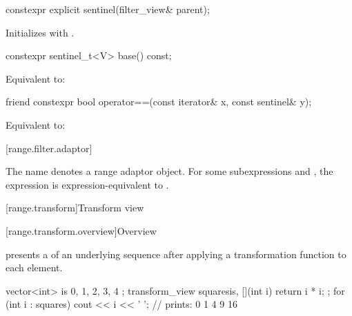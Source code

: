 %
\begin{itemdecl}
constexpr explicit sentinel(filter_view& parent);
\end{itemdecl}

\begin{itemdescr}
\pnum
\effects Initializes  with .
\end{itemdescr}

%
\begin{itemdecl}
constexpr sentinel_t<V> base() const;
\end{itemdecl}

\begin{itemdescr}
\pnum
\effects Equivalent to: 
\end{itemdescr}

%
\begin{itemdecl}
friend constexpr bool operator==(const iterator& x, const sentinel& y);
\end{itemdecl}

\begin{itemdescr}
\pnum
\effects Equivalent to: 
\end{itemdescr}

[range.filter.adaptor]{}

\pnum
The name  denotes a
range adaptor object.
For some subexpressions  and ,
the expression  is expression-equivalent to
.


[range.transform]{Transform view}

[range.transform.overview]{Overview}

\pnum
{} presents
a  of an underlying sequence after
applying a transformation function to each element.

\pnum
\begin{example}
\begin{codeblock}
vector<int> is{ 0, 1, 2, 3, 4 };
transform_view squares{is, [](int i) { return i * i; }};
for (int i : squares)
  cout << i << ' '; // prints: 0 1 4 9 16
\end{codeblock}
\end{example}

